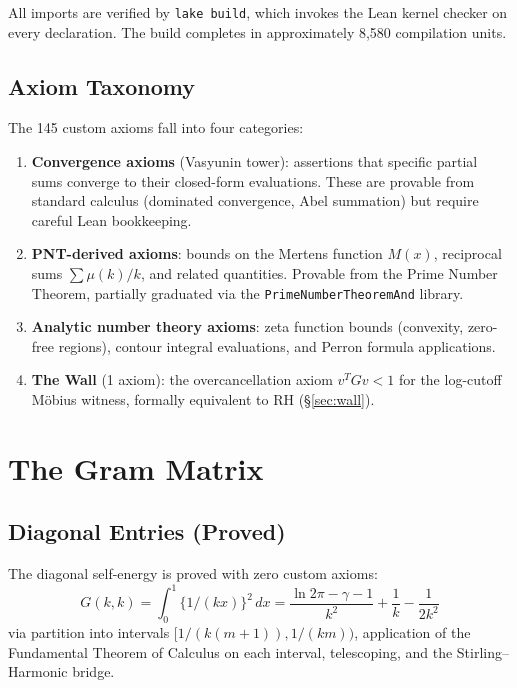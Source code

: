 \documentclass[11pt,a4paper]{article}
\theoremstyle{definition}
\newcommand{\lean}[1]{\texttt{#1}}
\newcommand{\fract}[1]{\{#1\}}
\begin{document}
All imports are verified by \lean{lake build}, which invokes the
Lean kernel checker on every declaration. The build completes in
approximately 8,580 compilation units.

\subsection{Axiom Taxonomy}

The 145 custom axioms fall into four categories:

\begin{enumerate}[label=(\alph*)]
  \item \textbf{Convergence axioms} (Vasyunin tower): assertions that
    specific partial sums converge to their closed-form evaluations.
    These are provable from standard calculus (dominated convergence,
    Abel summation) but require careful Lean bookkeeping.

  \item \textbf{PNT-derived axioms}: bounds on the Mertens function
    $M(x)$, reciprocal sums $\sum \mu(k)/k$, and related quantities.
    Provable from the Prime Number Theorem, partially graduated via
    the \lean{PrimeNumberTheoremAnd} library.

  \item \textbf{Analytic number theory axioms}: zeta function bounds
    (convexity, zero-free regions), contour integral evaluations, and
    Perron formula applications.

  \item \textbf{The Wall} (1 axiom): the overcancellation axiom
    $v^T G v < 1$ for the log-cutoff M\"obius witness, formally
    equivalent to RH (\S\ref{sec:wall}).
\end{enumerate}

\section{The Gram Matrix}
\label{sec:gram}

\subsection{Diagonal Entries (Proved)}

The diagonal self-energy is proved with zero custom axioms:
\[
  G(k,k) = \int_0^1 \fract{1/(kx)}^2\, dx
  = \frac{\ln 2\pi - \gamma - 1}{k^2}
  + \frac{1}{k} - \frac{1}{2k^2}
\]
via partition into intervals $[1/(k(m+1)), 1/(km))$, application of
the Fundamental Theorem of Calculus on each interval, telescoping,
and the Stirling--Harmonic bridge.
\end{document}
